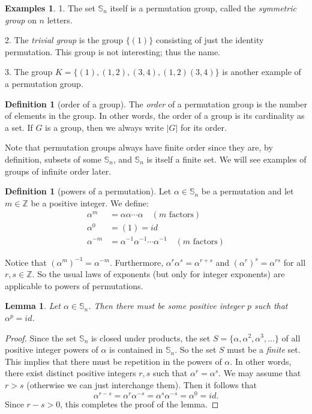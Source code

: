 \documentclass[11pt]{article}
\newtheorem{lem}[thm]{Lemma}
\theoremstyle{definition}
\newtheorem{defn}[thm]{Definition}
\newtheorem{examples}[thm]{Examples}
\newcommand{\Z}{\mathbb{Z}} %
\newcommand{\Sym}{\mathbb{S}}
\begin{document}
\begin{examples} 
1. The set $\Sym_n$ itself is a permutation group, called the
\emph{symmetric group} on $n$ letters. 

2. The \emph{trivial group} is the group $\{ (1) \}$ consisting of
just the identity permutation. This group is not interesting; thus the
name.

3. The group $K = \{ (1), (1,2), (3,4), (1,2)(3,4) \}$ is another
example of a permutation group.
\end{examples}



\begin{defn}[order of a group]
The {\em order} of a permutation group is the number of elements in
the group. In other words, the order of a group is its cardinality as
a set. If $G$ is a group, then we always write $|G|$ for its order.
\end{defn}


Note that permutation groups always have finite order since they are,
by definition, subsets of some $\Sym_n$, and $\Sym_n$ is itself a finite
set. We will see examples of groups of infinite order later.


\begin{defn}[powers of a permutation]
Let $\alpha \in \Sym_n$ be a permutation and let $m\in \Z$ be a positive
integer. We define:
\begin{align*} 
\alpha^m &= \alpha \alpha \cdots \alpha \quad (\text{$m$ factors})\\
\alpha^0 &= (1) = id \\
\alpha^{-m} &= \alpha^{-1} \alpha^{-1}\cdots \alpha^{-1} \quad(\text{$m$ factors})
\end{align*}
\end{defn}

Notice that $(\alpha^m)^{-1} = \alpha^{-m}$. Furthermore, $\alpha^r
\alpha^s = \alpha^{r+s}$ and $(\alpha^r)^s = \alpha^{rs}$ for all $r,s
\in \Z$. So the usual laws of exponents (but only for integer
exponents) are applicable to powers of permutations.


\begin{lem}
  Let $\alpha \in \Sym_n$. Then there must be some positive integer
  $p$ such that $\alpha^p = id$.
\end{lem}


\begin{proof}
Since the set $\Sym_n$ is closed under products, the set $S =
\{\alpha, \alpha^2, \alpha^3, \dots \}$ of all positive integer powers
of $\alpha$ is contained in $\Sym_n$. So the set $S$ must be a
\emph{finite} set. This implies that there must be repetition in the
powers of $\alpha$. In other words, there exist distinct positive
integers $r,s$ such that $\alpha^r = \alpha^s$. We may assume that
$r>s$ (otherwise we can just interchange them). Then it follows that
\[
  \alpha^{r-s} = \alpha^r \alpha^{-s} = \alpha^s \alpha^{-s} =
  \alpha^0 = id.
\]
Since $r-s > 0$, this completes the proof of the lemma.
\end{proof}
\end{document}
